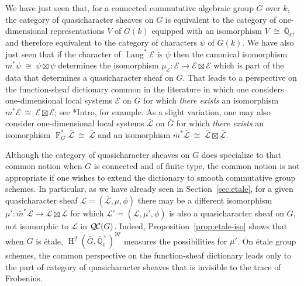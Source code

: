 \documentclass[CM,Submssn,SecEq]{degruyter-crelle} %
\theoremstyle{plain}
\theoremstyle{definition}
\theoremstyle{remark}
\newtheorem{remark}[theorem]{Remark}
\newcommand{\EE}{\mathbb{\bar Q}_\ell}
\newcommand{\Fq}{k}
\newcommand{\EEx}{\EE^\times}
\newcommand{\Weil}[1]{\mathcal{W}_{#1}}
\newcommand{\Frob}[1]{\operatorname{F}_{#1}}
\DeclareMathOperator{\Hh}{H}
\DeclareMathOperator{\Lang}{Lang}
\newcommand{\iso}{{\ \cong\ }}
\newcommand{\qcs}[1]{{\mathcal{#1}}}
\newcommand{\gqcs}[1]{{\mathcal{\bar #1}}}
\newcommand{\QC}{{\mathcal{Q\hskip-0.8pt C}}}
\newcommand{\bm}{\bar{m}}
\newcommand{\bG}{\bar{G}}
\begin{document}
We have just seen that, for a connected commutative algebraic group $G$ over $\Fq$, the category of quasicharacter sheaves on $G$ is equivalent to the category of one-dimensional representations $V$ of $G(\Fq)$ equipped with an isomorphism $V\iso \EE$, and therefore equivalent to the category of characters $\psi$ of $G(\Fq)$.
We have also just seen that if the character of $\Lang^*\qcs{E}$ is $\psi$ then the canonical isomorphism $m^*\psi \iso \psi \boxtimes \psi$ determines the isomorphism $\mu_\qcs{E} : \qcs{E} \to \qcs{E}\boxtimes\qcs{E}$ which is part of the data that determines a quasicharacter sheaf on $G$.
That leads to a perspective on the function-sheaf dictionary common in the literature in which one considers one-dimensional local systems $\qcs{E}$ on $G$ for which \emph{there exists} an isomorphism $m^*\qcs{E} \iso \qcs{E} \boxtimes\qcs{E}$; see \cite{kamgarpour:09a}*{Intro}, for example.
As a slight variation, one may also consider one-dimensional local systems $\gqcs{L}$ on $\bG$ for which \emph{there exists} an isomorphism $\Frob{G}^*\gqcs{L} \iso \gqcs{L}$ and an isomorphism $\bm^*\gqcs{L} \iso \gqcs{L} \boxtimes\gqcs{L}$.

Although the category of quasicharacter sheaves on $G$ does specialize to that common notion when $G$ is connected and of finite type, the common notion is not appropriate if one wishes to extend the dictionary to smooth commutative group schemes. 
In particular, as we have already seen in Section~\ref{sec:etale}, for a given quasicharacter sheaf $\qcs{L} = (\gqcs{L},\mu,\phi)$ there may be a different isomorphism $\mu' : \bm^*\gqcs{L} \to \gqcs{L}\boxtimes\gqcs{L}$ for which $\qcs{L}'=(\gqcs{L},\mu',\phi)$ is also a quasicharacter sheaf on $G$, not isomorphic to $\qcs{L}$ in $\QC(G)$.
Indeed, Proposition~\ref{prop:etale-iso} shows that when $G$ is \'etale, $\Hh^2(\bG,\EEx)^{\Weil{}}$ measures the possibilities for $\mu'$.
On \'etale group schemes, the common perspective on the function-sheaf dictionary leads only to the part of category of quasicharacter sheaves that is invisible to the trace of Frobenius.
\end{document}
